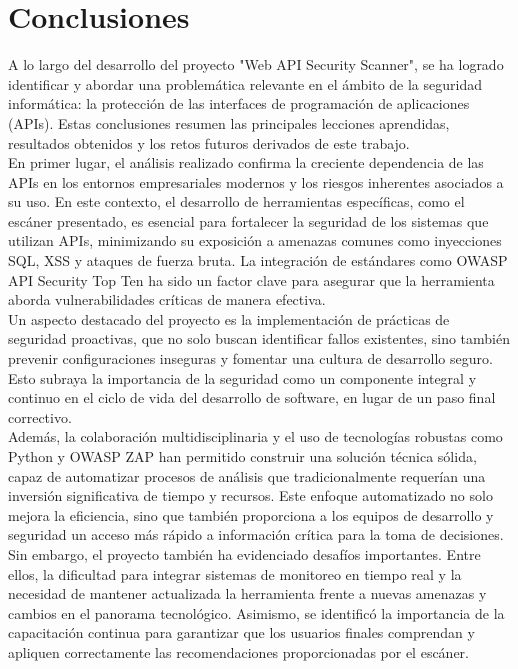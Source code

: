 \documentclass{article}
\begin{document}
    \section{Conclusiones}
    A lo largo del desarrollo del proyecto "Web API Security Scanner", se ha logrado identificar y abordar una problemática relevante en el ámbito de la seguridad informática: la protección de las interfaces de programación de aplicaciones (APIs). Estas conclusiones resumen las principales lecciones aprendidas, resultados obtenidos y los retos futuros derivados de este trabajo.
    \\[2\baselineskip]
    En primer lugar, el análisis realizado confirma la creciente dependencia de las APIs en los entornos empresariales modernos y los riesgos inherentes asociados a su uso. En este contexto, el desarrollo de herramientas específicas, como el escáner presentado, es esencial para fortalecer la seguridad de los sistemas que utilizan APIs, minimizando su exposición a amenazas comunes como inyecciones SQL, XSS y ataques de fuerza bruta. La integración de estándares como OWASP API Security Top Ten ha sido un factor clave para asegurar que la herramienta aborda vulnerabilidades críticas de manera efectiva.
    \\[2\baselineskip]
    Un aspecto destacado del proyecto es la implementación de prácticas de seguridad proactivas, que no solo buscan identificar fallos existentes, sino también prevenir configuraciones inseguras y fomentar una cultura de desarrollo seguro. Esto subraya la importancia de la seguridad como un componente integral y continuo en el ciclo de vida del desarrollo de software, en lugar de un paso final correctivo.
    \\[2\baselineskip]
    Además, la colaboración multidisciplinaria y el uso de tecnologías robustas como Python y OWASP ZAP han permitido construir una solución técnica sólida, capaz de automatizar procesos de análisis que tradicionalmente requerían una inversión significativa de tiempo y recursos. Este enfoque automatizado no solo mejora la eficiencia, sino que también proporciona a los equipos de desarrollo y seguridad un acceso más rápido a información crítica para la toma de decisiones.
    \\[2\baselineskip]
    Sin embargo, el proyecto también ha evidenciado desafíos importantes. Entre ellos, la dificultad para integrar sistemas de monitoreo en tiempo real y la necesidad de mantener actualizada la herramienta frente a nuevas amenazas y cambios en el panorama tecnológico. Asimismo, se identificó la importancia de la capacitación continua para garantizar que los usuarios finales comprendan y apliquen correctamente las recomendaciones proporcionadas por el escáner.
\end{document}

